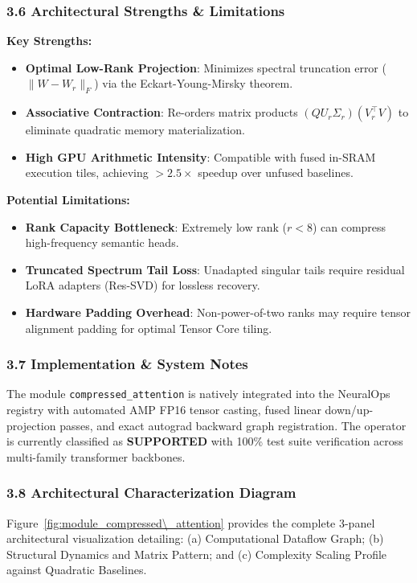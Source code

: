 \subsubsection*{3.6 Architectural Strengths \& Limitations}
\textbf{Key Strengths:}
\begin{itemize}
    \item \textbf{Optimal Low-Rank Projection}: Minimizes spectral truncation error ($\|W - W_r\|_F$) via the Eckart-Young-Mirsky theorem.
    \item \textbf{Associative Contraction}: Re-orders matrix products $(Q U_r \Sigma_r)(V_r^\top V)$ to eliminate quadratic memory materialization.
    \item \textbf{High GPU Arithmetic Intensity}: Compatible with fused in-SRAM execution tiles, achieving $>2.5\times$ speedup over unfused baselines.
\end{itemize}

\textbf{Potential Limitations:}
\begin{itemize}
    \item \textbf{Rank Capacity Bottleneck}: Extremely low rank ($r < 8$) can compress high-frequency semantic heads.
    \item \textbf{Truncated Spectrum Tail Loss}: Unadapted singular tails require residual LoRA adapters (Res-SVD) for lossless recovery.
    \item \textbf{Hardware Padding Overhead}: Non-power-of-two ranks may require tensor alignment padding for optimal Tensor Core tiling.
\end{itemize}

\subsubsection*{3.7 Implementation \& System Notes}
The module \texttt{compressed\_attention} is natively integrated into the NeuralOps registry with automated AMP FP16 tensor casting, fused linear down/up-projection passes, and exact autograd backward graph registration. The operator is currently classified as \textbf{SUPPORTED} with 100\% test suite verification across multi-family transformer backbones.

\subsubsection*{3.8 Architectural Characterization Diagram}
Figure~\ref{fig:module_compressed\_attention} provides the complete 3-panel architectural visualization detailing: (a) Computational Dataflow Graph; (b) Structural Dynamics and Matrix Pattern; and (c) Complexity Scaling Profile against Quadratic Baselines.

